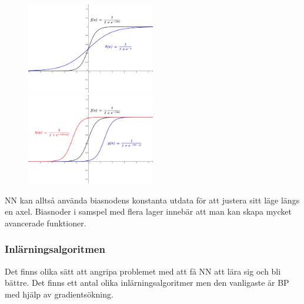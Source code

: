 \documentclass[a4paper,10pt]{article}
\begin{document}
\begin{figure}[ht]
\includegraphics[width=0.5\textwidth]{Sigmoidw}
\includegraphics[width=0.5\textwidth]{Sigmoidb}
\end{figure}


NN kan alltså använda biasnodens konstanta utdata för att justera sitt läge längs en axel. Biasnoder i samspel med flera lager innebär att man kan skapa mycket avancerade funktioner.

\subsubsection{Inlärningsalgoritmen}
Det finns olika sätt att angripa problemet med att få NN att lära sig och bli bättre. Det finns ett antal olika inlärningsalgoritmer men den vanligaste är BP med hjälp av gradientsökning.
\end{document}

